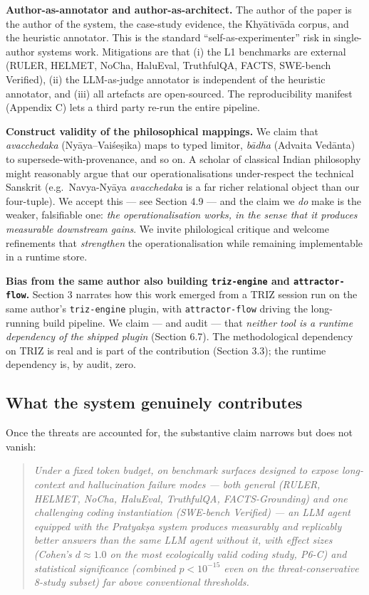 \textbf{Author-as-annotator and author-as-architect.} The author of the paper is the author of the system, the case-study evidence, the Khyātivāda corpus, and the heuristic annotator. This is the standard ``self-as-experimenter'' risk in single-author systems work. Mitigations are that (i) the L1 benchmarks are external (RULER, HELMET, NoCha, HaluEval, TruthfulQA, FACTS, SWE-bench Verified), (ii) the LLM-as-judge annotator is independent of the heuristic annotator, and (iii) all artefacts are open-sourced. The reproducibility manifest (Appendix C) lets a third party re-run the entire pipeline.

\textbf{Construct validity of the philosophical mappings.} We claim that \emph{avacchedaka} (Nyāya--Vaiśeṣika) maps to typed limitor, \emph{bādha} (Advaita Vedānta) to supersede-with-provenance, and so on. A scholar of classical Indian philosophy might reasonably argue that our operationalisations under-respect the technical Sanskrit (e.g.~Navya-Nyāya \emph{avacchedaka} is a far richer relational object than our four-tuple). We accept this --- see Section 4.9 --- and the claim we \emph{do} make is the weaker, falsifiable one: \emph{the operationalisation works, in the sense that it produces measurable downstream gains}. We invite philological critique and welcome refinements that \emph{strengthen} the operationalisation while remaining implementable in a runtime store.

\textbf{Bias from the same author also building \passthrough{\lstinline!triz-engine!} and \passthrough{\lstinline!attractor-flow!}.} Section 3 narrates how this work emerged from a TRIZ session run on the same author's \passthrough{\lstinline!triz-engine!} plugin, with \passthrough{\lstinline!attractor-flow!} driving the long-running build pipeline. We claim --- and audit --- that \emph{neither tool is a runtime dependency of the shipped plugin} (Section 6.7). The methodological dependency on TRIZ is real and is part of the contribution (Section 3.3); the runtime dependency is, by audit, zero.

\subsection{What the system genuinely contributes}\label{what-the-system-genuinely-contributes}

Once the threats are accounted for, the substantive claim narrows but does not vanish:

\begin{quote}
\emph{Under a fixed token budget, on benchmark surfaces designed to expose long-context and hallucination failure modes --- both general (RULER, HELMET, NoCha, HaluEval, TruthfulQA, FACTS-Grounding) and one challenging coding instantiation (SWE-bench Verified) --- an LLM agent equipped with the Pratyakṣa system produces measurably and replicably better answers than the same LLM agent without it, with effect sizes (Cohen's \(d \approx 1.0\) on the most ecologically valid coding study, P6-C) and statistical significance (combined \(p < 10^{-15}\) even on the threat-conservative 8-study subset) far above conventional thresholds.}
\end{quote}

